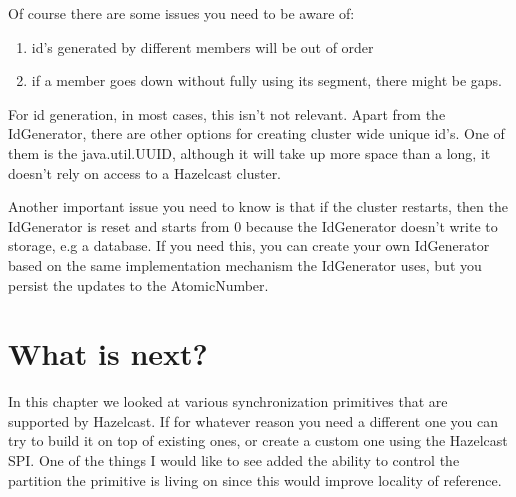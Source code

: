 Of course there are some issues you need to be aware of:
\begin{enumerate}
\item id's generated by different members will be out of order
\item if a member goes down without fully using its segment, there might be gaps.
\end{enumerate}
For id generation, in most cases, this isn't not relevant. Apart from the IdGenerator, there are other options for creating cluster wide unique id's. One of them is the java.util.UUID, although it will take up more space than a long, it doesn't rely on access to a Hazelcast cluster.

Another important issue you need to know is that if the cluster restarts, then the IdGenerator is reset and starts from 0 because the IdGenerator doesn't write to storage, e.g a database. If you need this, you can create your own IdGenerator based on the same implementation mechanism the IdGenerator uses, but you persist the updates to the AtomicNumber.

\section{What is next?}
In this chapter we looked at various synchronization primitives that are supported by Hazelcast. If for whatever reason you need a different one you can try to build it on top of existing ones, or create a custom one using the Hazelcast SPI. One of the things I would like to see added the ability to control the partition the primitive is living on since this would improve locality of reference. 

